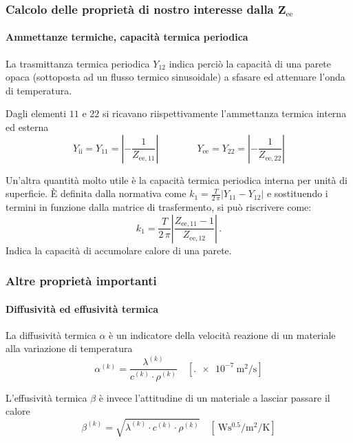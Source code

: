 \documentclass[aspectratio=141,10pt]{beamer}
\newcommand{\e}{\`E\xspace}  %
\begin{document}
\begin{frame}
    \frametitle{Calcolo delle proprietà di nostro interesse dalla $\mathbf{Z}_{\text{ee}}$}
\framesubtitle{Ammettanze termiche, capacità termica periodica}

La trasmittanza termica periodica $Y_{12}$ indica perciò la capacità di una parete opaca (sottoposta ad un flusso termico sinusoidale) a sfasare ed attenuare l'onda di temperatura.
\vspace{1cm}

\pause
Dagli elementi {\footnotesize $11$} e {\footnotesize $22$} si ricavano riispettivamente l'ammettanza termica interna ed esterna 
\begin{equation*}
    Y_{\text{ii}}=Y_{11} = \left\lvert -\frac{1}{Z_{\text{ee},11}}\right\rvert \qquad \qquad
    Y_{\text{ee}}=Y_{22} = \left\lvert -\frac{1}{Z_{\text{ee},22}}\right\rvert 
\end{equation*}     

Un'altra quantità molto utile è la capacità termica periodica interna per unità di superficie. \e definita dalla normativa come $k_1 = \frac{T}{2\,\pi} \left\lvert Y_{11} - Y_{12}\right\rvert$ e sostituendo i termini in funzione dalla matrice di trasfermento, si può riscrivere come:
\begin{equation*}
    k_1 = \frac{T}{2\,\pi} \left\lvert \frac{Z_{\text{ee},11} - 1}{Z_{\text{ee},12}}\right\rvert\,.
\end{equation*}
Indica la capacità di accumolare calore di una parete.
\end{frame}
\begin{frame}
    \frametitle{Altre proprietà importanti}
    \framesubtitle{Diffusività ed effusività termica}

    La diffusività termica $\alpha$ è un indicatore della velocità reazione di un materiale alla variazione di temperatura
    \begin{equation*}
        \alpha^{(k)} = \dfrac{\lambda^{(k)}}{c^{(k)} \cdot \rho^{(k)}} \quad \left[\SI{.e-7}{\metre\squared\per\second}\right]
    \end{equation*}
    \vspace{1cm}

    L'effusività termica $\beta$ è invece l'attitudine di un materiale a lasciar passare il calore
    \begin{equation*}
        \beta^{(k)} = \sqrt{\lambda^{(k)} \cdot c^{(k)} \cdot \rho^{(k)}} \quad \left[\SI{}{\watt\second\tothe{0.5}\per\metre\squared\per\kelvin}\right]
    \end{equation*}


\end{frame}
\end{document}
